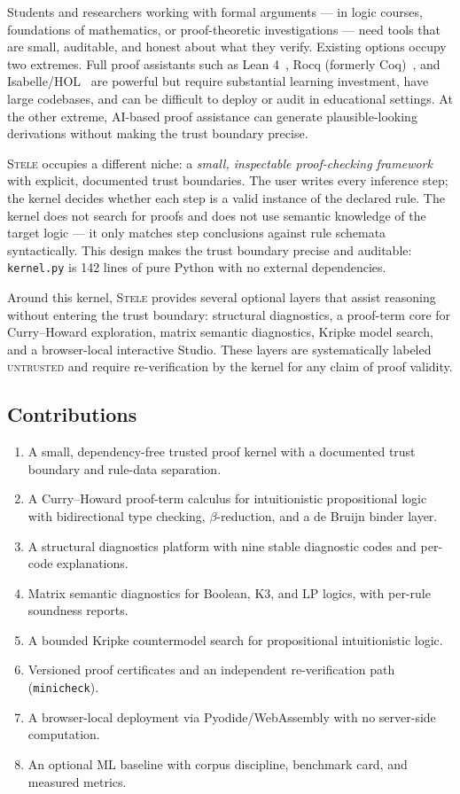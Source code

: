 \documentclass[11pt,a4paper]{article}
\theoremstyle{definition}
\theoremstyle{plain}
\newcommand{\stele}{\textsc{Stele}}
\newcommand{\kernel}{\texttt{kernel.py}}
\newcommand{\untrusted}{\textsc{untrusted}}
\begin{document}
Students and researchers working with formal arguments --- in logic
courses, foundations of mathematics, or proof-theoretic investigations
--- need tools that are small, auditable, and honest about what they
verify.
Existing options occupy two extremes.
Full proof assistants such as Lean 4~\cite{Moura2021}, Rocq
(formerly Coq)~\cite{Rocq}, and Isabelle/HOL~\cite{Nipkow2002} are
powerful but require substantial learning investment, have large
codebases, and can be difficult to deploy or audit in educational
settings.
At the other extreme, AI-based proof assistance can generate
plausible-looking derivations without making the trust boundary
precise.

\stele{} occupies a different niche: a \emph{small, inspectable
proof-checking framework} with explicit, documented trust
boundaries.
The user writes every inference step; the kernel decides whether
each step is a valid instance of the declared rule.
The kernel does not search for proofs and does not use semantic
knowledge of the target logic --- it only matches step conclusions
against rule schemata syntactically.
This design makes the trust boundary precise and auditable:
\kernel{} is 142 lines of pure Python with no external dependencies.

Around this kernel, \stele{} provides several optional layers that
assist reasoning without entering the trust boundary: structural
diagnostics, a proof-term core for Curry--Howard exploration,
matrix semantic diagnostics, Kripke model search, and a
browser-local interactive Studio.
These layers are systematically labeled \untrusted{} and require
re-verification by the kernel for any claim of proof validity.

\subsection*{Contributions}

\begin{enumerate}[leftmargin=*]
  \item A small, dependency-free trusted proof kernel with a
        documented trust boundary and rule-data separation.
  \item A Curry--Howard proof-term calculus for intuitionistic
        propositional logic with bidirectional type checking,
        $\beta$-reduction, and a de Bruijn binder layer.
  \item A structural diagnostics platform with nine stable
        diagnostic codes and per-code explanations.
  \item Matrix semantic diagnostics for Boolean, K3, and LP
        logics, with per-rule soundness reports.
  \item A bounded Kripke countermodel search for propositional
        intuitionistic logic.
  \item Versioned proof certificates and an independent
        re-verification path (\texttt{minicheck}).
  \item A browser-local deployment via Pyodide/WebAssembly with
        no server-side computation.
  \item An optional ML baseline with corpus discipline,
        benchmark card, and measured metrics.
\end{enumerate}
\end{document}
